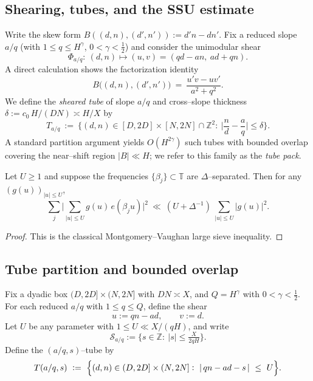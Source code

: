 \subsection{Shearing, tubes, and the SSU estimate}\label{subsec:BG.SSU}

Write the skew form $B((d,n),(d',n')):=d'n-dn'$. Fix a reduced slope $a/q$ (with $1\le q\le H^\gamma$, $0<\gamma<\tfrac12$) and consider the unimodular shear
\begin{equation}\label{eq:BG.shear}
\Phi_{a/q}:\ (d,n)\mapsto (u,v)=(q d - a n,\ a d + q n).
\end{equation}
A direct calculation shows the factorization identity
\begin{equation}\label{eq:BG.factor}
B\big((d,n),(d',n')\big) \ =\ \frac{u'v - uv'}{a^2+q^2}.
\end{equation}
We define the \emph{sheared tube} of slope $a/q$ and cross–slope thickness $\delta:=c_0\,H/(DN)\asymp H/X$ by
\begin{equation}\label{eq:BG.tube}
T_{a/q}\ :=\ \Big\{(d,n)\in [D,2D]\times[N,2N]\cap\mathbb{Z}^2:\ \Big|\frac{n}{d}-\frac{a}{q}\Big|\le \delta\Big\}.
\end{equation}
A standard partition argument yields $O(H^{2\gamma})$ such tubes with bounded overlap covering the near–shift region $|B|\ll H$; we refer to this family as the \emph{tube pack}.

\begin{lemma}\label{lem:BG.SALS}
Let $U\ge 1$ and suppose the frequencies $\{\beta_j\}\subset\mathbb{T}$ are $\Delta$–separated. Then for any $(g(u))_{|u|\le U}$,
\[
\sum_j \Big|\sum_{|u|\le U} g(u)\,e(\beta_j u)\Big|^2
\ \ll\ (U+\Delta^{-1})\ \sum_{|u|\le U} |g(u)|^2.
\]
\end{lemma}

\begin{proof}
This is the classical Montgomery–Vaughan large sieve inequality.
\end{proof}

\subsection{Tube partition and bounded overlap}\label{subsec:tubes-partition}

Fix a dyadic box $(D,2D]\times(N,2N]$ with $DN\asymp X$, and $Q=H^\gamma$ with $0<\gamma<\tfrac12$.
For each reduced $a/q$ with $1\le q\le Q$, define the shear
\[
u:= qn-ad,\qquad v:= d.
\]
Let $U$ be any parameter with $1\le U \ll X/(qH)$, and write
\[
\mathcal{S}_{a/q}:=\Big\{s\in \mathbb{Z}:\ |s|\le \tfrac{X}{2qH}\Big\}.
\]
Define the $(a/q,s)$–tube by
\begin{equation}\label{eq:def-tube}
T(a/q,s)\ :=\ \Bigl\{(d,n)\in (D,2D]\times(N,2N]:\ |\,qn-ad-s\,|\ \le\ U\Bigr\}.
\end{equation}

